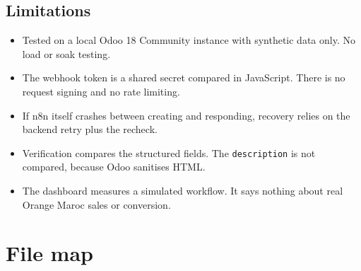 \documentclass[11pt,a4paper]{article}
\newcommand{\f}[1]{\texttt{#1}}
\begin{document}
\subsection*{Limitations}
\begin{itemize}
  \item Tested on a local Odoo 18 Community instance with synthetic data only. No load or soak testing.
  \item The webhook token is a shared secret compared in JavaScript. There is no request signing and no rate limiting.
  \item If n8n itself crashes between creating and responding, recovery relies on the backend retry plus the recheck.
  \item Verification compares the structured fields. The \f{description} is not compared, because Odoo sanitises HTML.
  \item The dashboard measures a simulated workflow. It says nothing about real Orange Maroc sales or conversion.
\end{itemize}

\appendix
\section{File map}
\end{document}
